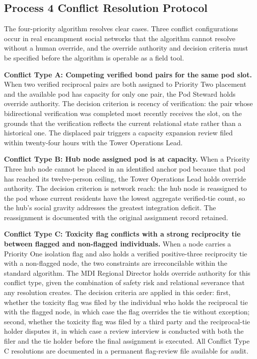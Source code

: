 \documentclass[12pt, letterpaper]{article}
\begin{document}
\subsection{Process 4 Conflict Resolution Protocol}

The four-priority algorithm resolves clear cases. Three conflict configurations occur in real encampment social networks that the algorithm cannot resolve without a human override, and the override authority and decision criteria must be specified before the algorithm is operable as a field tool.

\textbf{Conflict Type A: Competing verified bond pairs for the same pod slot.} When two verified reciprocal pairs are both assigned to Priority Two placement and the available pod has capacity for only one pair, the Pod Steward holds override authority. The decision criterion is recency of verification: the pair whose bidirectional verification was completed most recently receives the slot, on the grounds that the verification reflects the current relational state rather than a historical one. The displaced pair triggers a capacity expansion review filed within twenty-four hours with the Tower Operations Lead.

\textbf{Conflict Type B: Hub node assigned pod is at capacity.} When a Priority Three hub node cannot be placed in an identified anchor pod because that pod has reached its twelve-person ceiling, the Tower Operations Lead holds override authority. The decision criterion is network reach: the hub node is reassigned to the pod whose current residents have the lowest aggregate verified-tie count, so the hub's social gravity addresses the greatest integration deficit. The reassignment is documented with the original assignment record retained.

\textbf{Conflict Type C: Toxicity flag conflicts with a strong reciprocity tie between flagged and non-flagged individuals.} When a node carries a Priority One isolation flag and also holds a verified positive-three reciprocity tie with a non-flagged node, the two constraints are irreconcilable within the standard algorithm. The MDI Regional Director holds override authority for this conflict type, given the combination of safety risk and relational severance that any resolution creates. The decision criteria are applied in this order: first, whether the toxicity flag was filed by the individual who holds the reciprocal tie with the flagged node, in which case the flag overrides the tie without exception; second, whether the toxicity flag was filed by a third party and the reciprocal-tie holder disputes it, in which case a review interview is conducted with both the filer and the tie holder before the final assignment is executed. All Conflict Type C resolutions are documented in a permanent flag-review file available for audit.
\end{document}
